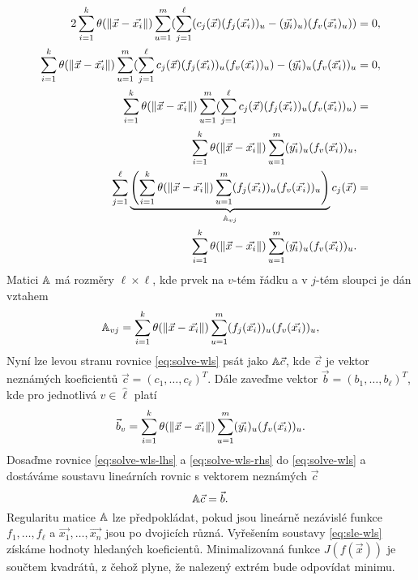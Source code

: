 \begin{align}
  \label{eq:solve-wls}
  2\sum_{i=1}^k \theta(\|\vec{x} - \vec{x_i}\|) \sum_{u=1}^m (\sum_{j=1}^\ell (c_j(\vec{x})(f_j(\vec{x_i}))_u - (\vec{y_i})_u)(f_v(\vec{x_i})_u)) &= 0,\notag\\
  \sum_{i=1}^k \theta(\|\vec{x} - \vec{x_i}\|) \sum_{u=1}^m (\sum_{j=1}^\ell c_j(\vec{x})(f_j(\vec{x_i}))_u(f_v(\vec{x_i}))_u) - (\vec{y_i})_u(f_v(\vec{x_i}))_u &= 0,\notag\\
  \sum_{i=1}^k \theta(\|\vec{x} - \vec{x_i}\|) \sum_{u=1}^m (\sum_{j=1}^\ell c_j(\vec{x})(f_j(\vec{x_i}))_u(f_v(\vec{x_i}))_u) &=\notag\\
  \sum_{i=1}^k \theta(\|\vec{x} - \vec{x_i}\|) \sum_{u=1}^m (\vec{y_i})_u(f_v(\vec{x_i}))_u,\notag\\
  \sum_{j=1}^\ell \underbrace{\left(\sum_{i=1}^k \theta(\|\vec{x} - \vec{x_i}\|) \sum_{u=1}^m (f_j(\vec{x_i}))_u(f_v(\vec{x_i}))_u\right)}_{\mathbb{A}_{vj}}c_j(\vec{x}) &=\notag\\
  \sum_{i=1}^k \theta(\|\vec{x} - \vec{x_i}\|) \sum_{u=1}^m (\vec{y_i})_u(f_v(\vec{x_i}))_u.
\end{align}
Matici $\mathbb{A}$ má rozměry $\ell \times \ell$, kde prvek na $v$-tém řádku a v $j$-tém sloupci je dán vztahem
\begin{equation}
  \label{eq:solve-wls-lhs}
  \mathbb{A}_{vj} = \sum_{i=1}^k \theta(\|\vec{x} - \vec{x_i}\|) \sum_{u=1}^m (f_j(\vec{x_i}))_u(f_v(\vec{x_i}))_u,
\end{equation}
Nyní lze levou stranu rovnice \eqref{eq:solve-wls} psát jako $\mathbb{A}\vec{c}$, kde $\vec{c}$ je vektor neznámých koeficientů $\vec{c} = (c_1, \ldots, c_\ell)^T$. Dále zaveďme vektor $\vec{b} = (b_1,\ldots,b_\ell)^T$, kde pro jednotlivá $v \in \hat \ell$ platí
\begin{equation}
  \label{eq:solve-wls-rhs}
  \vec{b}_v = \sum_{i=1}^k \theta(\|\vec{x} - \vec{x_i}\|) \sum_{u=1}^m (\vec{y_i})_u(f_v(\vec{x_i}))_u.
\end{equation}
Dosaďme rovnice \eqref{eq:solve-wls-lhs} a \eqref{eq:solve-wls-rhs} do \eqref{eq:solve-wls} a dostáváme soustavu lineárních rovnic s vektorem neznámých $\vec{c}$
\begin{equation}
  \label{eq:sle-wls}
  \mathbb{A}\vec{c} = \vec{b}.
\end{equation}
Regularitu matice $\mathbb{A}$ lze předpokládat, pokud jsou lineárně nezávislé funkce $f_1, \ldots, f_\ell$ a $\vec{x_1}, \ldots, \vec{x_n}$ jsou po dvojicích různá. Vyřešením soustavy \ref{eq:sle-wls} získáme hodnoty hledaných koeficientů. Minimalizovaná funkce $J(f(\vec{x}))$ je součtem kvadrátů, z čehož plyne, že nalezený extrém bude odpovídat minimu.


